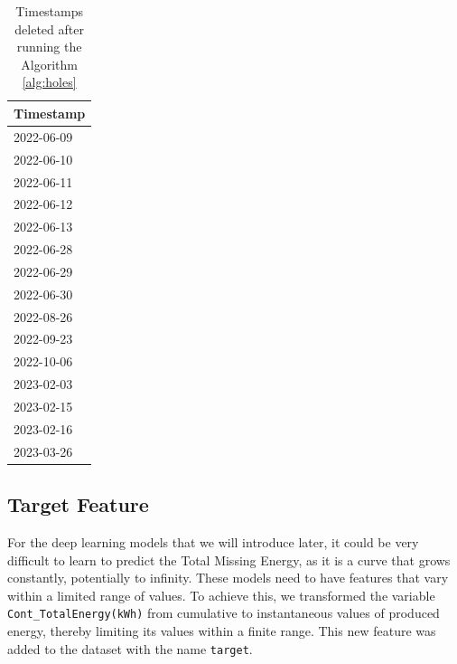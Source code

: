 \begin{minipage}[t]{0.30\linewidth}
	\begin{table}[H]
		\centering
		\begin{tabular}[c]{l}
			\multicolumn{1}{c}{\textbf{Timestamp}} \\
			\hline
			2022-06-09                             \\
			2022-06-10                             \\
			2022-06-11                             \\
			2022-06-12                             \\
			2022-06-13                             \\
			2022-06-28                             \\
			2022-06-29                             \\
			2022-06-30                             \\
			2022-08-26                             \\
			2022-09-23                             \\
			2022-10-06                             \\
			2023-02-03                             \\
			2023-02-15                             \\
			2023-02-16                             \\
			2023-03-26                             \\
		\end{tabular}
		\caption{Timestamps deleted after running the Algorithm \ref{alg:holes}}
	\end{table}
\end{minipage}

\subsection{Target Feature}
For the deep learning models that we will introduce later,
it could be very difficult to learn to predict the Total Missing Energy,
as it is a curve that grows constantly, potentially to infinity.
These models need to have features that vary within a limited range of
values. To achieve this, we transformed the variable
\verb|Cont_TotalEnergy(kWh)| from cumulative to instantaneous values of
produced energy, thereby limiting its values within a finite range.
This new feature was added to the dataset with the name \verb|target|.

